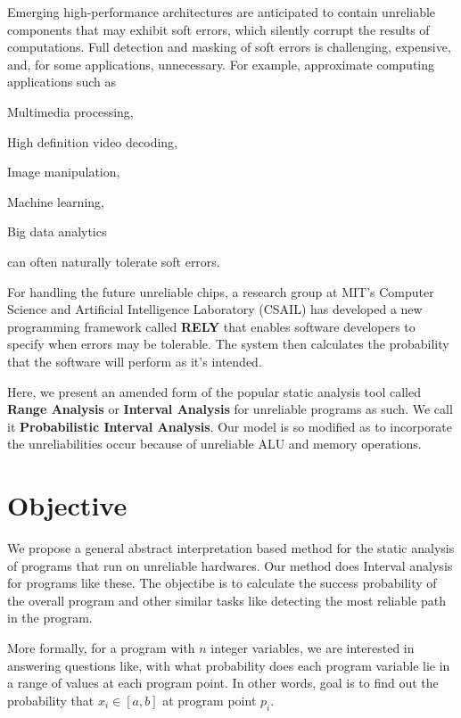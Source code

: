 \documentclass[final,3p, review, times]{util/elsarticle}
\begin{document}
Emerging high-performance architectures are anticipated to contain unreliable components that may exhibit soft errors, which silently corrupt the results of computations. Full detection and masking of soft errors is challenging, expensive, and, for some applications, unnecessary. For example, approximate computing applications such as
\begin{inparaenum}
  \item Multimedia processing,
  \item High definition video decoding,
  \item Image manipulation,
  \item Machine learning,
  \item Big data analytics
\end{inparaenum}
can often naturally tolerate soft errors.

For handling the future unreliable chips, a research group at MIT's Computer Science and Artificial Intelligence Laboratory (CSAIL) has developed a new programming framework called \textbf{RELY}\cite{carbin13} that enables software developers to specify when errors may be tolerable. The system then calculates the probability that the software will perform as it's intended.

Here, we present an amended form of the popular static analysis tool called \textbf{Range Analysis} or \textbf{Interval Analysis} for unreliable programs as such. We call it \textbf{Probabilistic Interval Analysis}. Our model is so modified as to incorporate the unreliabilities occur because of unreliable ALU and memory operations.

\section{Objective}

We propose a general abstract interpretation based method for the static analysis of programs that run on unreliable hardwares. Our method does Interval analysis for programs like these. The objectibe is to calculate the success probability of the overall program and other similar tasks like detecting the most reliable path in the program.

More formally, for a program with $n$ integer variables, we are interested in answering questions like, with what probability does each program variable lie in a range of values at each program point. In other words, goal is to find out the probability that $x_i\in[a,b]$ at program point $p_i$.
\end{document}
